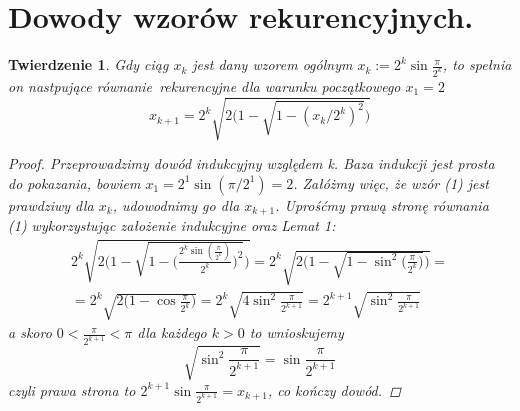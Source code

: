\documentclass[10pt,wide]{mwart}
\newtheorem{tw}{Twierdzenie}
\theoremstyle{definition}
\begin{document}
 \section{Dowody wzorów rekurencyjnych.}
 \begin{tw}
  Gdy ciąg \(x_k\) jest dany wzorem ogólnym \( x_k := 2^{k}\sin\frac{\pi}{2^k} \), to spełnia on nastpujące równanie rekurencyjne dla warunku początkowego \( x_1 = 2\)
  \begin{equation}
  x_{k+1} = 2^{k}\sqrt{2\Big(1 - \sqrt{1 - (x_{k}/2^{k})^2}\Big)}
  \end{equation}
  \begin{proof}
    Przeprowadzimy dowód indukcyjny względem k.
    Baza indukcji jest prosta do pokazania, bowiem \( x_1 = 2^1 \sin(\pi/2^1) = 2 \).
    Załóżmy więc, że wzór (1) jest prawdziwy dla \(x_k \), udowodnimy go dla \(x_{k+1} \).
    Uprośćmy prawą stronę równania (1) wykorzystując założenie indukcyjne oraz Lemat 1:
    \begin{equation*}
    \begin{split}
    2^{k}\sqrt{2\Bigg(1 - \sqrt{1 - \Big(\frac{2^{k}\sin(\frac{\pi}{2^{k}})}{2^{k}}\Big)^2}\Bigg)} = 2^{k}\sqrt{2\Bigg(1 - \sqrt{ 1 - \sin^2\Big(\frac{\pi}{2^{k}}\Big)}\Bigg)} = \\
    = 2^k\sqrt{2\Big(1 - \cos{\frac{\pi}{2^k}}\Big)} = 2^k\sqrt{4\sin^2{\frac{\pi}{2^{k+1}}}} = 2^{k+1}\sqrt{\sin^2{\frac{\pi}{2^{k+1}}}}
    \end{split}
    \end{equation*}
    a skoro \( 0 < \frac{\pi}{2^{k+1}} < \pi \) dla każdego \( k > 0 \) to wnioskujemy
    \begin{equation*}
    \sqrt{\sin^2{\frac{\pi}{2^{k+1}}}} = \sin{\frac{\pi}{2^{k+1}}}
    \end{equation*}
    czyli prawa strona to \(2^{k+1}\sin{\frac{\pi}{2^{k+1}}} = x_{k+1} \), co kończy dowód.
  \end{proof}
 \end{tw}
\end{document}
